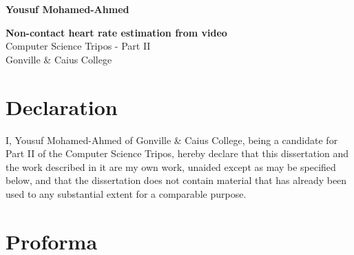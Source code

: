 \documentclass[12pt,twoside,notitlepage]{report}
\begin{document}





\pagestyle{empty}

\hfill{\LARGE \bf Yousuf Mohamed-Ahmed}

\vspace*{60mm}
\begin{center}
\Huge
{\bf Non-contact heart rate estimation from video} \\
\vspace*{5mm}
Computer Science Tripos - Part II  \\
\vspace*{5mm}
Gonville \& Caius College\\
\vspace*{5mm}
\end{center}

\chapter*{Declaration}

I, Yousuf Mohamed-Ahmed of Gonville \& Caius College, being a candidate for Part II of the Computer
Science Tripos, hereby declare
that this dissertation and the work described in it are my own work,
unaided except as may be specified below, and that the dissertation
does not contain material that has already been used to any substantial
extent for a comparable purpose.

\bigskip
{}

\medskip
{}


\setcounter{page}{1}
\pagestyle{plain}

\chapter*{Proforma}
\end{document}
